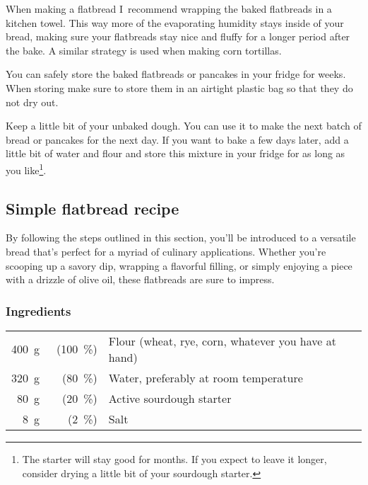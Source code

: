 When making a flatbread I~recommend wrapping the baked flatbreads in a kitchen
towel. This way more of the evaporating humidity stays inside of your bread,
making sure your flatbreads stay nice and fluffy for a longer period after the
bake. A similar strategy is used when making corn tortillas.

You can safely store the baked flatbreads or pancakes in your fridge
for weeks. When storing make sure to store them in an airtight plastic bag so that
they do not dry out.

Keep a little bit of your unbaked dough. You can use it to make the next
batch of bread or pancakes for the next day. If you want to bake a few days later, add
a little bit of water and flour and store this mixture in your fridge
for as long as you like\footnote{The starter will stay good for months. If you expect to
leave it longer, consider drying a little bit of your sourdough starter.}.

\subsection{Simple flatbread recipe}%
\label{subsec:flat-bread-recipe}

By following the steps outlined in this section,
you'll be introduced to a versatile bread that's perfect for a myriad of
culinary applications. Whether you're scooping up a savory dip,
wrapping a flavorful filling, or simply enjoying a piece with a drizzle
of olive oil, these flatbreads are sure to impress.

\subsubsection*{Ingredients}

\begin{tabular}{r@{}rl@{}}
\qty{400}{\gram} &~(\qty{100}{\percent}) & Flour (wheat, rye, corn, whatever you have at hand)\\
\qty{320}{\gram} &  (\qty{80}{\percent}) & Water, preferably at room temperature\\
\qty{80}{\gram}  &  (\qty{20}{\percent}) & Active sourdough starter\\
\qty{8}{\gram}   &   (\qty{2}{\percent}) & Salt\\
\end{tabular}


